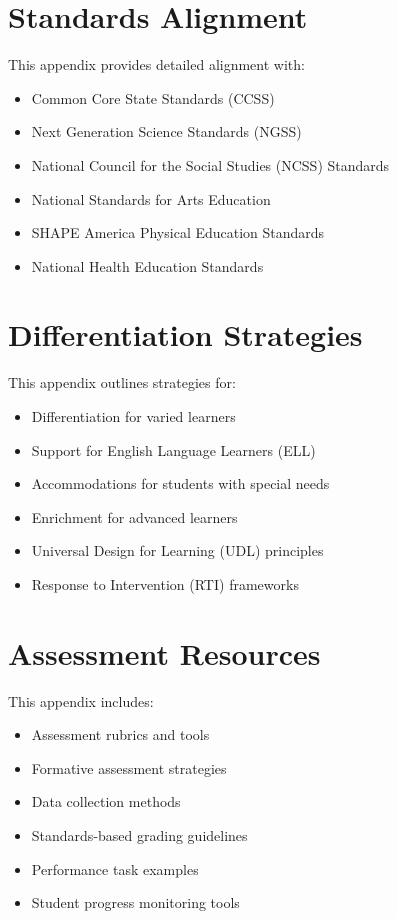 \documentclass[11pt,letterpaper]{report}
\begin{document}
\clearpage

\appendix

\chapter{Standards Alignment}

This appendix provides detailed alignment with:

\begin{itemize}
    \item Common Core State Standards (CCSS)
    \item Next Generation Science Standards (NGSS)
    \item National Council for the Social Studies (NCSS) Standards
    \item National Standards for Arts Education
    \item SHAPE America Physical Education Standards
    \item National Health Education Standards
\end{itemize}

\chapter{Differentiation Strategies}

This appendix outlines strategies for:

\begin{itemize}
    \item Differentiation for varied learners
    \item Support for English Language Learners (ELL)
    \item Accommodations for students with special needs
    \item Enrichment for advanced learners
    \item Universal Design for Learning (UDL) principles
    \item Response to Intervention (RTI) frameworks
\end{itemize}

\chapter{Assessment Resources}

This appendix includes:

\begin{itemize}
    \item Assessment rubrics and tools
    \item Formative assessment strategies
    \item Data collection methods
    \item Standards-based grading guidelines
    \item Performance task examples
    \item Student progress monitoring tools
\end{itemize}
\end{document}
